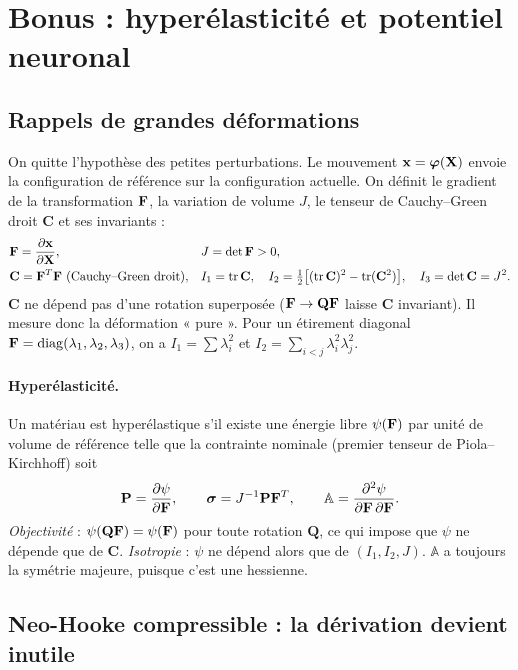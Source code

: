 \section{Bonus : hyperélasticité et potentiel neuronal}\label{sec:hyper}

\subsection{Rappels de grandes déformations}

On quitte l'hypothèse des petites perturbations. Le mouvement $\mathbf{x}=\boldsymbol{\varphi}(\mathbf{X})$ envoie la configuration de référence sur la configuration actuelle. On définit le gradient de la transformation $\mathbf{F}$, la variation de volume $J$, le tenseur de Cauchy--Green droit $\mathbf{C}$ et ses invariants :
\begin{align*}
&\mathbf{F} = \frac{\partial\mathbf{x}}{\partial\mathbf{X}}, && J=\det\mathbf{F}>0,\\
&\mathbf{C}=\mathbf{F}^T\mathbf{F} \ \text{(Cauchy--Green droit)}, && I_1=\operatorname{tr}\mathbf{C},\quad I_2=\tfrac12\big[(\operatorname{tr}\mathbf{C})^2-\operatorname{tr}(\mathbf{C}^2)\big],\quad I_3=\det\mathbf{C}=J^2.
\end{align*}
$\mathbf{C}$ ne dépend pas d'une rotation superposée ($\mathbf{F}\to\mathbf{Q}\mathbf{F}$ laisse $\mathbf{C}$ invariant). Il mesure donc la déformation « pure ». Pour un étirement diagonal $\mathbf{F}=\mathrm{diag}(\lambda_1,\lambda_2,\lambda_3)$, on a $I_1=\sum\lambda_i^2$ et $I_2=\sum_{i<j}\lambda_i^2\lambda_j^2$.

\paragraph{Hyperélasticité.} Un matériau est hyperélastique s'il existe une énergie libre $\psi(\mathbf{F})$ par unité de volume de référence telle que la contrainte nominale (premier tenseur de Piola--Kirchhoff) soit
\begin{equation}
\mathbf{P} = \frac{\partial\psi}{\partial\mathbf{F}},\qquad \boldsymbol{\sigma} = J^{-1}\mathbf{P}\mathbf{F}^T,\qquad \mathbb{A}=\frac{\partial^2\psi}{\partial\mathbf{F}\,\partial\mathbf{F}}.
\end{equation}
\emph{Objectivité} : $\psi(\mathbf{Q}\mathbf{F})=\psi(\mathbf{F})$ pour toute rotation $\mathbf{Q}$, ce qui impose que $\psi$ ne dépende que de $\mathbf{C}$. \emph{Isotropie} : $\psi$ ne dépend alors que de $(I_1,I_2,J)$. $\mathbb{A}$ a toujours la symétrie majeure, puisque c'est une hessienne.

\subsection{Neo-Hooke compressible : la dérivation devient inutile}

